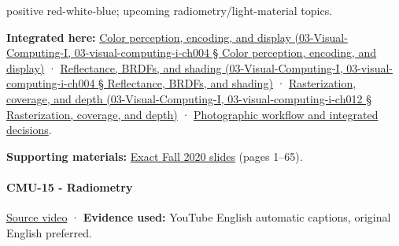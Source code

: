 positive red-white-blue; upcoming radiometry/light-material topics.

\textbf{Integrated here:} \href{}{Color perception, encoding, and display (03-Visual-Computing-I, 03-visual-computing-i-ch004 § Color perception, encoding, and display)} · \href{}{Reflectance, BRDFs, and shading (03-Visual-Computing-I, 03-visual-computing-i-ch004 § Reflectance, BRDFs, and shading)} · \href{}{Rasterization, coverage, and depth (03-Visual-Computing-I, 03-visual-computing-i-ch012 § Rasterization, coverage, and depth)} · \hyperref[04-visual-computing-ii-ch034]{Photographic workflow and integrated decisions}.

\textbf{Supporting materials:} \href{https://15462.courses.cs.cmu.edu/fall2020content/lectures/14_color/14_color_slides.pdf}{Exact Fall 2020 slides} (pages 1--65).

\paragraph{CMU-15 - Radiometry}\label{cmu-15---radiometry}

\href{https://www.youtube.com/watch?v=5lGYm8L_rfo}{Source video} · \textbf{Evidence used:} YouTube English automatic captions, original English preferred.

